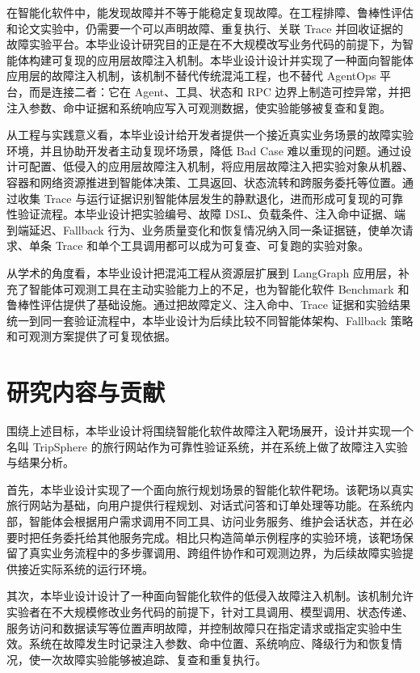 在智能化软件中，能发现故障并不等于能稳定复现故障。在工程排障、鲁棒性评估和论文实验中，仍需要一个可以声明故障、重复执行、关联 Trace 并回收证据的故障实验平台。本毕业设计研究目的正是在不大规模改写业务代码的前提下，为智能体构建可复现的应用层故障注入机制。本毕业设计设计并实现了一种面向智能体应用层的故障注入机制，该机制不替代传统混沌工程，也不替代 AgentOps 平台，而是连接二者：它在 Agent、工具、状态和 RPC 边界上制造可控异常，并把注入参数、命中证据和系统响应写入可观测数据，使实验能够被复查和复跑。

从工程与实践意义看，本毕业设计给开发者提供一个接近真实业务场景的故障实验环境，并且协助开发者主动复现坏场景，降低 Bad Case 难以重现的问题。通过设计可配置、低侵入的应用层故障注入机制，将应用层故障注入把实验对象从机器、容器和网络资源推进到智能体决策、工具返回、状态流转和跨服务委托等位置。通过收集 Trace 与运行证据识别智能体层发生的静默退化，进而形成可复现的可靠性验证流程。本毕业设计把实验编号、故障 DSL、负载条件、注入命中证据、端到端延迟、Fallback 行为、业务质量变化和恢复情况纳入同一条证据链，使单次请求、单条 Trace 和单个工具调用都可以成为可复查、可复跑的实验对象。

从学术的角度看，本毕业设计把混沌工程从资源层扩展到 LangGraph 应用层，补充了智能体可观测工具在主动实验能力上的不足，也为智能化软件 Benchmark 和鲁棒性评估提供了基础设施。通过把故障定义、注入命中、Trace 证据和实验结果统一到同一套验证流程中，本毕业设计为后续比较不同智能体架构、Fallback 策略和可观测方案提供了可复现依据。

\section{研究内容与贡献}

围绕上述目标，本毕业设计将围绕智能化软件故障注入靶场展开，设计并实现一个名叫 TripSphere 的旅行网站作为可靠性验证系统，并在系统上做了故障注入实验与结果分析。

首先，本毕业设计实现了一个面向旅行规划场景的智能化软件靶场。该靶场以真实旅行网站为基础，向用户提供行程规划、对话式问答和订单处理等功能。在系统内部，智能体会根据用户需求调用不同工具、访问业务服务、维护会话状态，并在必要时把任务委托给其他服务完成。相比只构造简单示例程序的实验环境，该靶场保留了真实业务流程中的多步骤调用、跨组件协作和可观测边界，为后续故障实验提供接近实际系统的运行环境。

其次，本毕业设计设计了一种面向智能化软件的低侵入故障注入机制。该机制允许实验者在不大规模修改业务代码的前提下，针对工具调用、模型调用、状态传递、服务访问和数据读写等位置声明故障，并控制故障只在指定请求或指定实验中生效。系统在故障发生时记录注入参数、命中位置、系统响应、降级行为和恢复情况，使一次故障实验能够被追踪、复查和重复执行。

